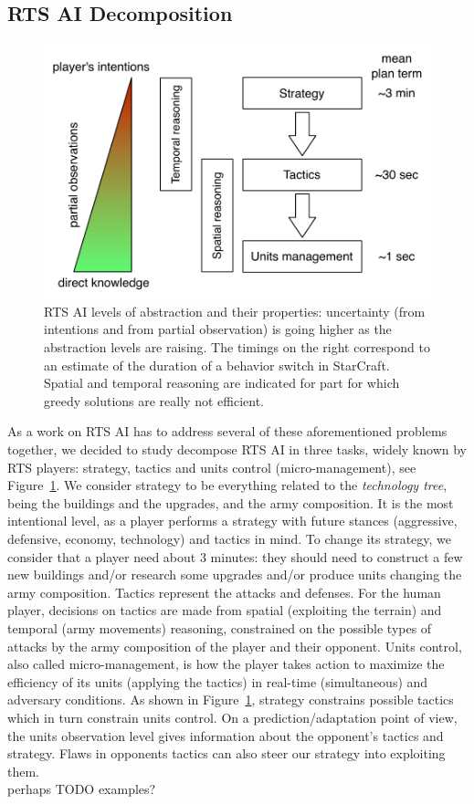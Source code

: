 \documentclass[journal]{IEEEtran}
\begin{document}
\subsection{RTS AI Decomposition}
\begin{figure}
    \centering
    \includegraphics[width=0.9\columnwidth]{figures/levels_abstraction.pdf}
    \caption{RTS AI levels of abstraction and their properties: uncertainty (from intentions and from partial observation) is going higher as the abstraction levels are raising. The timings on the right correspond to an estimate of the duration of a behavior switch in StarCraft. Spatial and temporal reasoning are indicated for part for which greedy solutions are really not efficient.}
    \label{fig:levels-abstraction}
\end{figure}
As a work on RTS AI has to address several of these aforementioned problems together, we decided to study decompose RTS AI in three tasks, widely known by RTS players: strategy, tactics and units control (micro-management), see Figure~\ref{fig:levels-abstraction}. We consider strategy to be everything related to the \textit{technology tree}, being the buildings and the upgrades, and the army composition. It is the most intentional level, as a player performs a strategy with future stances (aggressive, defensive, economy, technology) and tactics in mind. To change its strategy, we consider that a player need about 3 minutes: they should need to construct a few new buildings and/or research some upgrades and/or produce units changing the army composition. Tactics represent the attacks and defenses. For the human player, decisions on tactics are made from spatial (exploiting the terrain) and temporal (army movements) reasoning, constrained on the possible types of attacks by the army composition of the player and their opponent. Units control, also called micro-management, is how the player takes action to maximize the efficiency of its units (applying the tactics) in real-time (simultaneous) and adversary conditions. As shown in Figure~\ref{fig:levels-abstraction}, strategy constrains possible tactics which in turn constrain units control. On a prediction/adaptation point of view, the units observation level gives information about the opponent's tactics and strategy. Flaws in opponents tactics can also steer our strategy into exploiting them.\\
{\color{blue}
perhaps TODO examples?
}
\end{document}

